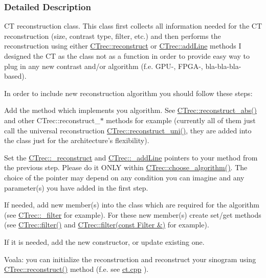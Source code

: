 \subsubsection{Detailed Description}
CT reconstruction class. This class first collects all information needed for the CT reconstruction (size, contrast type, filter, etc.) and then performs the reconstruction using either \hyperlink{classCTrec_a8a82f56167150e59d38bf831e812c4ea}{CTrec::reconstruct} or \hyperlink{classCTrec_acb42c0e929a3d2ee57bf9718b00686df}{CTrec::addLine} methods I designed the CT as the class not as a function in order to provide easy way to plug in any new contrast and/or algorithm (f.e. GPU-\/, FPGA-\/, bla-\/bla-\/bla-\/based).

In order to include new reconstruction algorithm you should follow these steps:
\begin{DoxyEnumerate}
\item Add the method which implements you algorithm. See \hyperlink{classCTrec_a3bb57574704cba563bd6ed4b744744de}{CTrec::reconstruct\_\-abs()} and other CTrec::reconstruct\_\-$\ast$ methods for example (currently all of them just call the universal reconstruction \hyperlink{classCTrec_a8da831c3e57bc8925b67155aa9dc06d7}{CTrec::reconstruct\_\-uni()}, they are added into the class just for the architecture's flexibility).
\item Set the \hyperlink{classCTrec_a09c82f115c45c386250a68cd0d8d957b}{CTrec::\_\-reconstruct} and \hyperlink{classCTrec_aff1a740cb831c50dceca306fe47c6062}{CTrec::\_\-addLine} pointers to your method from the previous step. Please do it ONLY within \hyperlink{classCTrec_a201dd58d6ae65a55ec1fd9f5300f7064}{CTrec::choose\_\-algorithm()}. The choice of the pointer may depend on any condition you can imagine and any parameter(s) you have added in the first step.
\item If needed, add new member(s) into the class which are required for the algorithm (see \hyperlink{classCTrec_a57ae11bb07c6d1015eab118a8e68cc7f}{CTrec::\_\-filter} for example). For these new member(s) create set/get methods (see \hyperlink{classCTrec_a3220ac29961577f2070a01612aa609fb}{CTrec::filter()} and \hyperlink{classCTrec_a3220ac29961577f2070a01612aa609fb}{CTrec::filter(const Filter \&)} for example).
\item If it is needed, add the new constructor, or update existing one.
\end{DoxyEnumerate}

Voala: you can initialize the reconstruction and reconstruct your sinogram using \hyperlink{classCTrec_a8a82f56167150e59d38bf831e812c4ea}{CTrec::reconstruct()} method (f.e. see \hyperlink{ct_8cpp}{ct.cpp} ). 

